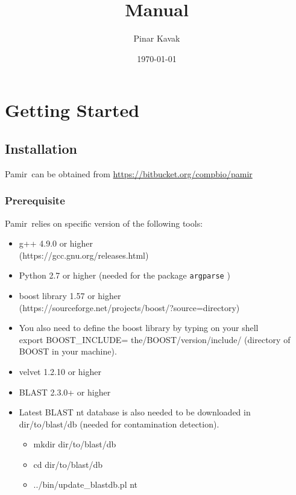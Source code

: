 \documentclass{article}
\title{\toolName Manual}
\author{Pinar Kavak}
\date{\today}
\newcommand{\toolName}{Pamir~}
\newcommand{\gitUrl}{https://bitbucket.org/compbio/pamir}
\begin{document}
\maketitle

\tableofcontents
\newpage

\section{Getting Started}

\subsection{Installation}
\toolName can be obtained from \url{\gitUrl}

\subsubsection{Prerequisite}
\toolName relies on specific version of the following tools:
\begin{itemize}
\item g++ 4.9.0 or higher \\
(https://gcc.gnu.org/releases.html)
\item Python 2.7 or higher (needed for the package \texttt{argparse} )
\item boost library 1.57 or higher \\ (https://sourceforge.net/projects/boost/?source=directory)
\item You also need to define the boost library by typing on your shell \\
export BOOST\_INCLUDE= the/BOOST/version/include/ (directory of BOOST in your machine).
\item velvet 1.2.10 or higher
\item BLAST 2.3.0+ or higher
\item Latest BLAST nt database is also needed to be downloaded in dir/to/blast/db (needed for contamination detection). 
\begin{itemize}
\item mkdir dir/to/blast/db
\item cd dir/to/blast/db
\item ../bin/update\_blastdb.pl nt
\end{itemize}

\end{itemize}
\end{document}
